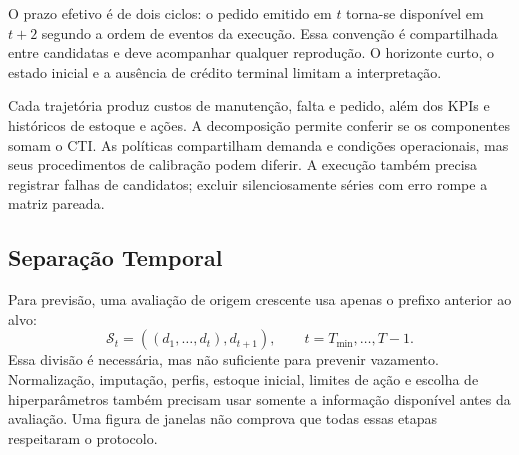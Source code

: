 O prazo efetivo é de dois ciclos: o pedido emitido em $t$ torna-se disponível em $t+2$ segundo a ordem de eventos da execução. Essa convenção é compartilhada entre candidatas e deve acompanhar qualquer reprodução. O horizonte curto, o estado inicial e a ausência de crédito terminal limitam a interpretação.

Cada trajetória produz custos de manutenção, falta e pedido, além dos KPIs e históricos de estoque e ações. A decomposição permite conferir se os componentes somam o CTI. As políticas compartilham demanda e condições operacionais, mas seus procedimentos de calibração podem diferir. A execução também precisa registrar falhas de candidatos; excluir silenciosamente séries com erro rompe a matriz pareada.

\subsection{Separação Temporal}
\label{sec:wf_protocol}

Para previsão, uma avaliação de origem crescente usa apenas o prefixo anterior ao alvo:
\begin{equation}
\mathcal S_t=((d_1,\ldots,d_t),d_{t+1}),\qquad t=T_{\min},\ldots,T-1.
\label{eq:wf_splits}
\end{equation}
Essa divisão é necessária, mas não suficiente para prevenir vazamento. Normalização, imputação, perfis, estoque inicial, limites de ação e escolha de hiperparâmetros também precisam usar somente a informação disponível antes da avaliação. Uma figura de janelas não comprova que todas essas etapas respeitaram o protocolo.

